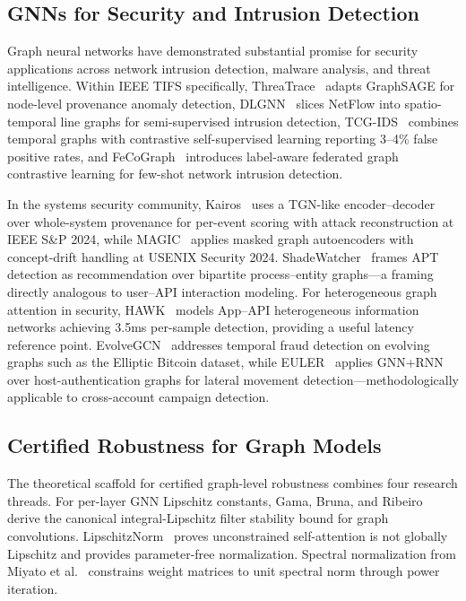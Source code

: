 \documentclass[journal]{IEEEtran}
\theoremstyle{plain}
\theoremstyle{definition}
\theoremstyle{remark}
\begin{document}
\subsection{GNNs for Security and Intrusion Detection}

Graph neural networks have demonstrated substantial promise for security applications across network intrusion detection, malware analysis, and threat intelligence. Within IEEE TIFS specifically, ThreaTrace~\cite{wang2022threatrace} adapts GraphSAGE for node-level provenance anomaly detection, DLGNN~\cite{duan2023dlgnn} slices NetFlow into spatio-temporal line graphs for semi-supervised intrusion detection, TCG-IDS~\cite{tcgids2025} combines temporal graphs with contrastive self-supervised learning reporting 3--4\% false positive rates, and FeCoGraph~\cite{fecograph2025} introduces label-aware federated graph contrastive learning for few-shot network intrusion detection.

In the systems security community, Kairos~\cite{cheng2024kairos} uses a TGN-like encoder--decoder over whole-system provenance for per-event scoring with attack reconstruction at IEEE S\&P 2024, while MAGIC~\cite{jia2024magic} applies masked graph autoencoders with concept-drift handling at USENIX Security 2024. ShadeWatcher~\cite{zeng2022shadewatcher} frames APT detection as recommendation over bipartite process--entity graphs---a framing directly analogous to user--API interaction modeling. For heterogeneous graph attention in security, HAWK~\cite{hei2024hawk} models App--API heterogeneous information networks achieving 3.5ms per-sample detection, providing a useful latency reference point. EvolveGCN~\cite{pareja2020evolvegcn} addresses temporal fraud detection on evolving graphs such as the Elliptic Bitcoin dataset, while EULER~\cite{king2022euler} applies GNN+RNN over host-authentication graphs for lateral movement detection---methodologically applicable to cross-account campaign detection.

\subsection{Certified Robustness for Graph Models}

The theoretical scaffold for certified graph-level robustness combines four research threads. For per-layer GNN Lipschitz constants, Gama, Bruna, and Ribeiro~\cite{gama2020stability} derive the canonical integral-Lipschitz filter stability bound for graph convolutions. LipschitzNorm~\cite{dasoulas2021lipschitznorm} proves unconstrained self-attention is not globally Lipschitz and provides parameter-free normalization. Spectral normalization from Miyato et al.~\cite{miyato2018spectral} constrains weight matrices to unit spectral norm through power iteration.
\end{document}
